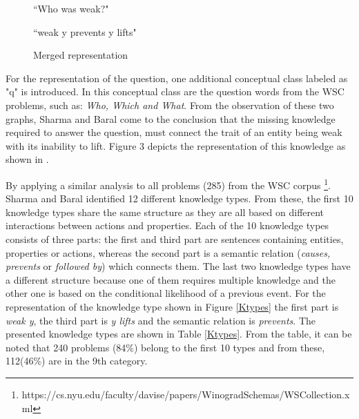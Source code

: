 \begin{figure} [h!]
	\centering
	
	\caption{\label{Graph12}``Who was weak?"}
\end{figure}

\begin{figure} [h!]
	\centering
	
	\caption{\label{Graph13} ``weak y prevents y lifts"}
\end{figure}

\begin{figure} [h!]
	\centering
	
	\caption{\label{Graph14} Merged representation}
\end{figure}

For the representation of the question, one additional conceptual class labeled as "q" is introduced. In this conceptual class are the question words from the WSC problems, such as: \textit{Who, Which and What}. 
From the observation of these two graphs, Sharma and Baral \cite{2018CommonsenseKT} come to the conclusion that the missing knowledge required to answer the question, must connect the trait of an entity being weak with its inability to lift. Figure 3 depicts the representation of this knowledge as shown in \cite{2018CommonsenseKT}. 

By applying a similar analysis to all problems (285) from the WSC corpus \footnote{https://cs.nyu.edu/faculty/davise/papers/WinogradSchemas/WSCollection.xml}. Sharma and Baral \cite{2018CommonsenseKT} identified 12 different knowledge types. From these, the first 10 knowledge types share the same structure as they are all based on different interactions between actions and properties. Each of the 10 knowledge types consists of three parts: the first and third part are sentences containing entities, properties or actions, whereas the second part is a semantic relation (\textit{causes, prevents} or \textit{followed by}) which connects them. The last two knowledge types have a different structure because one of them requires multiple knowledge and the other one is based on the conditional likelihood of a previous event. 
For the representation of the knowledge type shown in Figure \ref{Ktypes} the first part is \textit{weak y}, the third part is \textit{y lifts} and the semantic relation is \textit{prevents}. The presented knowledge types are shown in Table \ref{Ktypes}. From the table, it can be noted that 240 problems (84\%) belong to the first 10 types and from these, 112(46\%) are in the 9th category. \\ 

